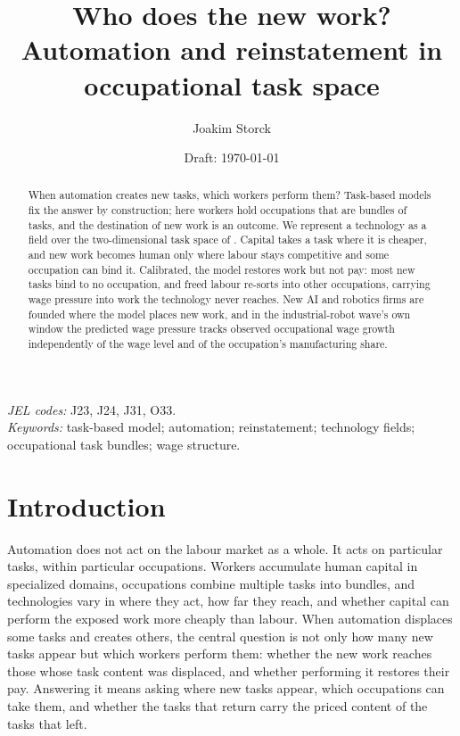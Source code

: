 \documentclass[12pt, a4paper]{article}
\title{Who does the new work? Automation and reinstatement in
occupational task space}
\author{Joakim Storck}
\date{Draft: \today}
\begin{document}
\maketitle

\begin{abstract}
\noindent
When automation creates new tasks, which workers perform them?
Task-based models fix the answer by construction; here workers hold
occupations that are bundles of tasks, and the destination of new work
is an outcome. We represent a technology as a field over the
two-dimensional task space of \textcite{storck2026geometry}. Capital
takes a task where it is cheaper, and new work becomes human only where
labour stays competitive and some occupation can bind it. Calibrated,
the model restores work but not pay: most new tasks bind to no
occupation, and freed labour re-sorts into other occupations, carrying
wage pressure into work the technology never reaches. New AI and
robotics firms are founded where the model places new work, and in the
industrial-robot wave's own window the predicted wage pressure tracks
observed occupational wage growth independently of the wage level and
of the occupation's manufacturing share.
\end{abstract}

\vspace{0.5em}
\noindent\emph{JEL codes:} J23, J24, J31, O33.\\
\emph{Keywords:} task-based model; automation; reinstatement;
technology fields; occupational task bundles; wage structure.

\section{Introduction}
\label{sec:intro}

Automation does not act on the labour market as a whole. It acts on
particular tasks, within particular occupations. Workers accumulate human capital in specialized
domains, occupations combine multiple tasks into bundles, and
technologies vary in where they act, how far they reach, and whether
capital can perform the exposed work more cheaply than labour. When
automation displaces some tasks and creates others, the central question
is not only how many new tasks appear but which workers perform them:
whether the new work reaches those whose task content was displaced, and
whether performing it restores their pay. Answering it means asking where
new tasks appear, which occupations can take them, and whether the tasks
that return carry the priced content of the tasks that left.
\end{document}
